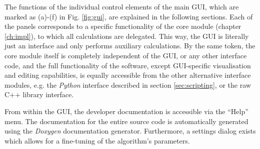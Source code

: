 The functions of the individual control elements of the main GUI, which are marked as (a)-(f)
in Fig. \ref{fig:gui}, are explained in the following sections. Each of the panels corresponds to a specific
functionality of the core module (chapter \ref{ch:impl}), to which all calculations are delegated. 
This way, the GUI is literally just an interface and only performs auxiliary calculations.
By the same token, the core module itself is completely independent of the GUI, or any other
interface code, and the full functionality of the software, except GUI-specific visualisation and editing
capabilities, is equally accessible from the other alternative interface modules, e.g. the \textit{Python}
interface described in section \ref{sec:scripting}, or the raw C++ library interface.

From within the GUI, the developer documentation is accessible via the ``Help'' menu.
The documentation for the entire source code is automatically generated using 
the \textit{Doxygen} \cite{web_doxygen} documentation generator.
Furthermore, a settings dialog exists which allows for a fine-tuning of the algorithm's
parameters.



